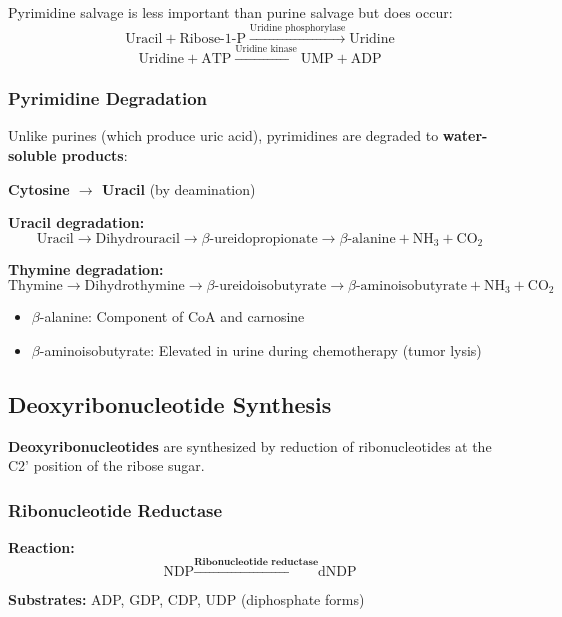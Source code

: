Pyrimidine salvage is less important than purine salvage but does occur:
\[
\text{Uracil} + \text{Ribose-1-P} \xrightarrow{\text{Uridine phosphorylase}} \text{Uridine}
\]
\[
\text{Uridine} + \text{ATP} \xrightarrow{\text{Uridine kinase}} \text{UMP} + \text{ADP}
\]

\subsubsection{Pyrimidine Degradation}

Unlike purines (which produce uric acid), pyrimidines are degraded to \textbf{water-soluble products}:

\textbf{Cytosine $\rightarrow$ Uracil} (by deamination)

\textbf{Uracil degradation:}
\[
\text{Uracil} \rightarrow \text{Dihydrouracil} \rightarrow \beta\text{-ureidopropionate} \rightarrow \beta\text{-alanine} + \text{NH}_3 + \text{CO}_2
\]

\textbf{Thymine degradation:}
\[
\text{Thymine} \rightarrow \text{Dihydrothymine} \rightarrow \beta\text{-ureidoisobutyrate} \rightarrow \beta\text{-aminoisobutyrate} + \text{NH}_3 + \text{CO}_2
\]

\begin{itemize}
    \item $\beta$-alanine: Component of CoA and carnosine
    \item $\beta$-aminoisobutyrate: Elevated in urine during chemotherapy (tumor lysis)
\end{itemize}

\subsection{Deoxyribonucleotide Synthesis}

\begin{definition}
\textbf{Deoxyribonucleotides} are synthesized by reduction of ribonucleotides at the C2' position of the ribose sugar.
\end{definition}

\subsubsection{Ribonucleotide Reductase}

\textbf{Reaction:}
\[
\text{NDP} \xrightarrow{\textbf{Ribonucleotide reductase}} \text{dNDP}
\]

\textbf{Substrates:} ADP, GDP, CDP, UDP (diphosphate forms)

